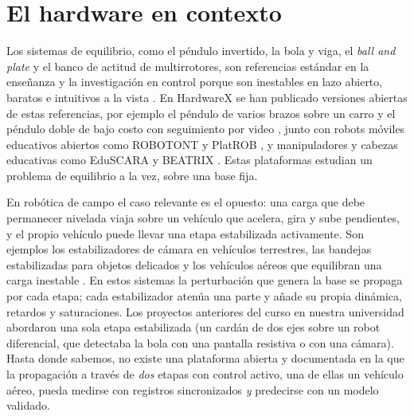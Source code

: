 \section{El hardware en contexto}
\label{sec:context}

Los sistemas de equilibrio, como el péndulo invertido, la bola y viga, el \textit{ball and plate} y el banco de actitud de multirrotores, son referencias estándar en la enseñanza y la investigación en control porque son inestables en lazo abierto, baratos e intuitivos a la vista \cite{astrom2008,hauser1992,awtar2002}. En HardwareX se han publicado versiones abiertas de estas referencias, por ejemplo el péndulo de varios brazos sobre un carro \cite{kaheman2023} y el péndulo doble de bajo costo con seguimiento por video \cite{myers2020}, junto con robots móviles educativos abiertos como ROBOTONT \cite{raudmae2023} y PlatROB \cite{balbuena2026}, y manipuladores y cabezas educativas como EduSCARA \cite{clark2026} y BEATRIX \cite{al2024}. Estas plataformas estudian un problema de equilibrio a la vez, sobre una base fija.

En robótica de campo el caso relevante es el opuesto: una carga que debe permanecer nivelada viaja sobre un vehículo que acelera, gira y sube pendientes, y el propio vehículo puede llevar una etapa estabilizada activamente. Son ejemplos los estabilizadores de cámara en vehículos terrestres, las bandejas estabilizadas para objetos delicados \cite{selvaggio2023} y los vehículos aéreos que equilibran una carga inestable \cite{hehn2011}. En estos sistemas la perturbación que genera la base se propaga por cada etapa; cada estabilizador atenúa una parte y añade su propia dinámica, retardos y saturaciones. Los proyectos anteriores del curso en nuestra universidad abordaron una sola etapa estabilizada (un cardán de dos ejes sobre un robot diferencial, que detectaba la bola con una pantalla resistiva o con una cámara). Hasta donde sabemos, no existe una plataforma abierta y documentada en la que la propagación a través de \emph{dos} etapas con control activo, una de ellas un vehículo aéreo, pueda medirse con registros sincronizados \emph{y} predecirse con un modelo validado.

